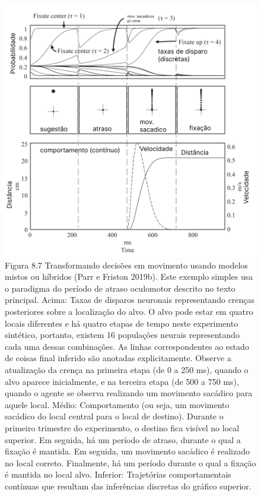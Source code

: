 \documentclass[
  12pt,
]{book}
\begin{document}
\begin{figure}
\centering
\includegraphics{images/Figura_8_7.png}
\caption{Figura 8.7 Transformando decisões em movimento usando modelos mistos ou híbridos (Parr e Friston 2019b). Este exemplo simples usa o paradigma do período de atraso oculomotor descrito no texto principal. Acima: Taxas de disparos neuronais representando crenças posteriores sobre a localização do alvo. O alvo pode estar em quatro locais diferentes e há quatro etapas de tempo neste experimento sintético, portanto, existem 16 populações neurais representando cada uma dessas combinações. As linhas correspondentes ao estado de coisas final inferido são anotadas explicitamente. Observe a atualização da crença na primeira etapa (de 0 a 250 ms), quando o alvo aparece inicialmente, e na terceira etapa (de 500 a 750 ms), quando o agente se observa realizando um movimento sacádico para aquele local. Médio: Comportamento (ou seja, um movimento sacádico do local central para o local de destino). Durante o primeiro trimestre do experimento, o destino fica visível no local superior. Em seguida, há um período de atraso, durante o qual a fixação é mantida. Em seguida, um movimento sacádico é realizado no local correto. Finalmente, há um período durante o qual a fixação é mantida no local alvo. Inferior: Trajetórias comportamentais contínuas que resultam das inferências discretas do gráfico superior.}
\end{figure}
\end{document}
